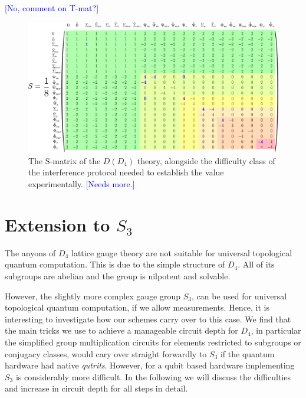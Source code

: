 \documentclass[two column]{article}
\newcommand{\jovan}[1]{\textcolor{blue}{[#1]}}
\begin{document}
\jovan{No, comment on T-mat?}



 



\begin{figure}
	\centering
	\includegraphics[width=\textwidth]{Figures/S_mat_with_diff.pdf}
	\caption{The S-matrix of the $D(D_4)$ theory, alongside the difficulty class of the interference protocol needed to establish the value experimentally. \jovan{Needs more.}}
\end{figure}

\section{Extension to $S_3$}\label{sec:other_gauge}

The anyons of $D_4$ lattice gauge theory are not suitable for universal topological quantum computation.
This is due to the simple structure of $D_4$. All of its subgroups are abelian and the group is nilpotent and solvable. 



However, the slightly more complex gauge group $S_3$, can be used for universal topological quantum computation, if we allow measurements. Hence, it is interesting to investigate how our schemes carry over to this case. We find that the main tricks we use to achieve a manageable circuit depth for $D_4$, in particular the simplified group multiplication circuits for elements restricted to subgroups or conjugacy classes, would cary over straight forwardly to $S_3$ if the quantum hardware had native \emph{qutrits}. However, for a qubit based hardware implementing $S_3$ is considerably more difficult. In the following we will discuss the difficulties and increase in circuit depth for all steps in detail. 
\end{document}
